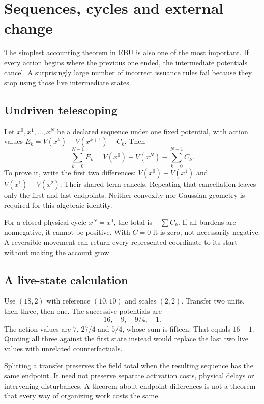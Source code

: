 \chapter{Sequences, cycles and external change}\label{ch:cycles}
The simplest accounting theorem in EBU is also one of the most important.
If every action begins where the previous one ended, the intermediate
potentials cancel. A surprisingly large number of incorrect issuance rules
fail because they stop using those live intermediate states.

\section{Undriven telescoping}
Let $x^0,x^1,\ldots,x^N$ be a declared sequence under one fixed potential,
with action values $E_k=V(x^k)-V(x^{k+1})-C_k$. Then
\begin{equation}\label{eq:telescope}
 \sum_{k=0}^{N-1}E_k
 =V(x^0)-V(x^N)-\sum_{k=0}^{N-1}C_k.
\end{equation}
To prove it, write the first two differences: $V(x^0)-V(x^1)$ and
$V(x^1)-V(x^2)$. Their shared term cancels. Repeating that cancellation
leaves only the first and last endpoints. Neither convexity nor Gaussian
geometry is required for this algebraic identity.

For a closed physical cycle $x^N=x^0$, the total is $-\sum C_k$.
If all burdens are nonnegative, it cannot be positive. With $C=0$ it is
zero, not necessarily negative. A reversible movement can return every
represented coordinate to its start without making the account grow.

\section{A live-state calculation}
Use $(18,2)$ with reference $(10,10)$ and scales $(2,2)$. Transfer two
units, then three, then one. The successive potentials are
\begin{equation}
 16,\quad9,\quad9/4,\quad1.
\end{equation}
The action values are $7$, $27/4$ and $5/4$, whose sum is fifteen.
That equals $16-1$. Quoting all three against the first state instead
would replace the last two live values with unrelated counterfactuals.

Splitting a transfer preserves the field total when the resulting sequence
has the same endpoint. It need not preserve separate activation costs,
physical delays or intervening disturbances. A theorem about endpoint
differences is not a theorem that every way of organizing work costs the same.

